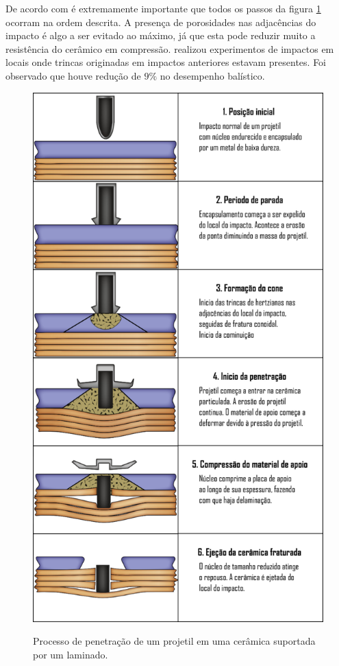 De acordo com \cite{Crouch} é extremamente importante que todos os passos da figura \ref{fig:processo} ocorram na ordem descrita. A presença de porosidades nas adjacências do impacto é algo a ser evitado ao máximo, já que esta pode reduzir muito a resistência do cerâmico em compressão. \cite{Crouch} realizou experimentos de impactos em locais onde trincas originadas em impactos anteriores estavam presentes. Foi observado que houve redução de $9\%$ no desempenho balístico. 



\begin{figure}
    \centering
    \caption{Processo de penetração de um projetil em uma cerâmica suportada por um laminado.}
    \includegraphics[width=0.7\linewidth]{images/processodepenetra.png}
    \label{fig:processo}
\end{figure}


 